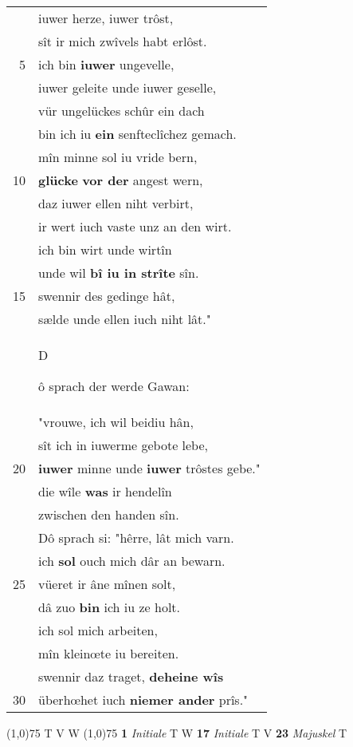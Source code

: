 \documentclass[8pt,a4paper,notitlepage]{article}
\begin{document}
\begin{table}[ht]
\begin{minipage}[t]{0.5\linewidth}
\begin{tabular}{rl}
 & iuwer herze, iuwer trôst,\\ 
 & sît ir mich zwîvels habt erlôst.\\ 
5 & ich bin \textbf{iuwer} ungevelle,\\ 
 & iuwer geleite unde iuwer geselle,\\ 
 & vür ungelückes schûr ein dach\\ 
 & bin ich iu \textbf{ein} senfteclîchez gemach.\\ 
 & mîn minne sol iu vride bern,\\ 
10 & \textbf{glücke} \textbf{vor der} angest wern,\\ 
 & daz iuwer ellen niht verbirt,\\ 
 & ir wert iuch vaste unz an den wirt.\\ 
 & ich bin wirt unde wirtîn\\ 
 & unde wil \textbf{bî iu in strîte} sîn.\\ 
15 & swennir des gedinge hât,\\ 
 & sælde unde ellen iuch niht lât."\\ 
 & \begin{large}D\end{large}ô sprach der werde Gawan:\\ 
 & "vrouwe, ich wil beidiu hân,\\ 
 & sît ich in iuwerme gebote lebe,\\ 
20 & \textbf{iuwer} minne unde \textbf{iuwer} trôstes gebe."\\ 
 & die wîle \textbf{was} ir hendelîn\\ 
 & zwischen den handen sîn.\\ 
 & Dô sprach si: "hêrre, lât mich varn.\\ 
 & ich \textbf{sol} ouch mich dâr an bewarn.\\ 
25 & vüeret ir âne mînen solt,\\ 
 & dâ zuo \textbf{bin} ich iu ze holt.\\ 
 & ich sol mich arbeiten,\\ 
 & mîn kleinœte iu bereiten.\\ 
 & swennir daz traget, \textbf{deheine wîs}\\ 
30 & überhœhet iuch \textbf{niemer ander} prîs."\\ 
\end{tabular}
\scriptsize
\line(1,0){75} \newline
T V W \newline
\line(1,0){75} \newline
\textbf{1} \textit{Initiale} T W  \textbf{17} \textit{Initiale} T V  \textbf{23} \textit{Majuskel} T  \newline

\end{minipage}
\end{table}
\end{document}
